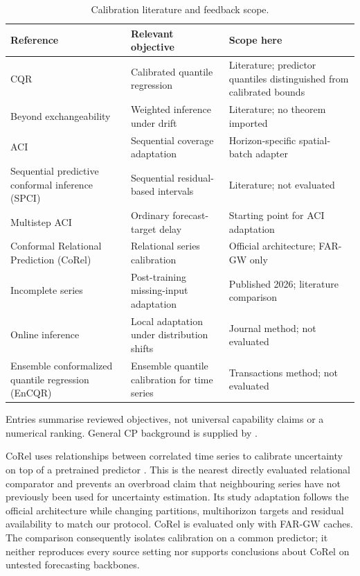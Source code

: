 \documentclass[pdflatex,sn-mathphys-num]{sn-jnl}
\begin{document}
\begin{table}[!htbp]\caption{Calibration literature and feedback scope.}\label{tab:related-calibration}\centering\setlength{\tabcolsep}{3pt}\small
\begin{tabular}{>{\raggedright\arraybackslash}p{}>{\raggedright\arraybackslash}p{}>{\raggedright\arraybackslash}p{}}\toprule
Reference & Relevant objective & Scope here \\\midrule
CQR \citep{romano2019} & Calibrated quantile regression & Literature; predictor quantiles distinguished from calibrated bounds \\
Beyond exchangeability \citep{barber2023} & Weighted inference under drift & Literature; no theorem imported \\
ACI \citep{gibbs2021} & Sequential coverage adaptation & Horizon-specific spatial-batch adapter \\
Sequential predictive conformal inference (SPCI) \citep{xu2023} & Sequential residual-based intervals & Literature; not evaluated \\
Multistep ACI \citep{hallberg2024} & Ordinary forecast-target delay & Starting point for ACI adaptation \\
Conformal Relational Prediction (CoRel) \citep{cini2025} & Relational series calibration & Official architecture; FAR-GW only \\
Incomplete series \citep{chen2026} & Post-training missing-input adaptation & Published 2026; literature comparison \\
Online inference \citep{gibbs2024} & Local adaptation under distribution shifts & Journal method; not evaluated \\
Ensemble conformalized quantile regression (EnCQR) \citep{jensen2024} & Ensemble quantile calibration for time series & Transactions method; not evaluated \\
\bottomrule\end{tabular}\par\smallskip\footnotesize Entries summarise reviewed objectives, not universal capability claims or a numerical ranking. General CP background is supplied by \citet{angelopoulos2023}.\end{table}
\FloatBarrier

CoRel uses relationships between correlated time series to calibrate uncertainty on top of a pretrained predictor \citep{cini2025}. This is the nearest directly evaluated relational comparator and prevents an overbroad claim that neighbouring series have not previously been used for uncertainty estimation. Its study adaptation follows the official architecture while changing partitions, multihorizon targets and residual availability to match our protocol. CoRel is evaluated only with FAR-GW caches. The comparison consequently isolates calibration on a common predictor; it neither reproduces every source setting nor supports conclusions about CoRel on untested forecasting backbones.
\end{document}
